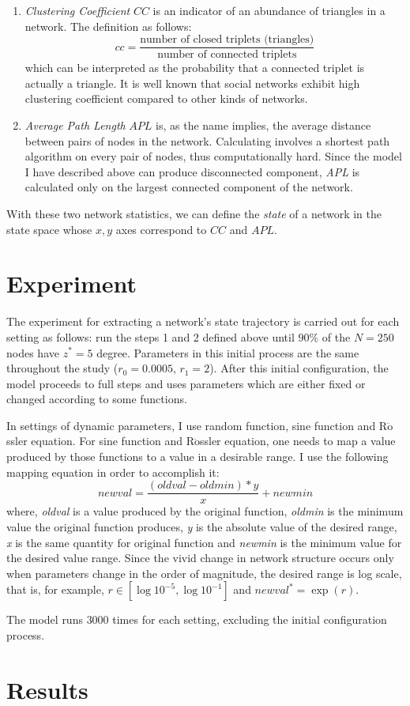 \documentclass{article}
\begin{document}
 \begin{enumerate}
\item \textit{Clustering Coefficient} $CC$ is an indicator of an abundance of triangles in a network. The definition as follows:
\[
	cc = \frac{\text{number of closed triplets (triangles)}}{\text{number of connected triplets}}
\]
which can be interpreted as the probability that a connected triplet is actually a triangle. It is well known that social networks exhibit high clustering coefficient compared to other kinds of networks.

\item \textit{Average Path Length} $APL$ is, as the name implies, the average distance between pairs of nodes in the network. Calculating involves a shortest path algorithm on every pair of nodes, thus computationally hard. Since the model I have described above can produce disconnected component, \textit{APL} is calculated only on the largest connected component of the network.
\end{enumerate}

With these two network statistics, we can define the \textit{state} of a network in the state space whose $x,y$ axes correspond to $CC$ and $APL$.

\section{Experiment}
The experiment for extracting a network's state trajectory is carried out for each setting as follows: run the steps 1 and 2 defined above until $90\%$ of the $N = 250$ nodes have $z^* = 5$ degree. Parameters in this initial process are the same throughout the study ($r_{0}=0.0005$, $r_{1}=2$).
 After this initial configuration, the model proceeds to full steps and uses parameters which are either fixed or changed according to some functions.
 
 In settings of dynamic parameters, I use random function, sine function and R$\ddot{\text{o}}$ssler equation. For sine function and R$\ddot{\text{o}}$ssler equation, one needs to map a value produced by those functions to a value in a desirable range. I use the following mapping equation in order to accomplish it:
 \[
 	newval = \frac{(oldval - oldmin)*y}{x} + newmin
 \]
 where, \textit{oldval} is a value produced by the original function,  \textit{oldmin} is the minimum value the original function produces,  \textit{y} is the absolute value of the desired range,  \textit{x} is the same quantity for original function and \textit{newmin} is the minimum value for the desired value range. Since the vivid change in network structure occurs only when parameters change in the order of magnitude, the desired range is log scale, that is, for example, $r \in \left[ \log10^{-5},\log10^{-1}\right]$ and $newval^* = \exp(r)$. 
 
 The model runs $3000$ times for each setting, excluding the initial configuration process.
 
 \section{Results}
 
 

 
\end{document}
